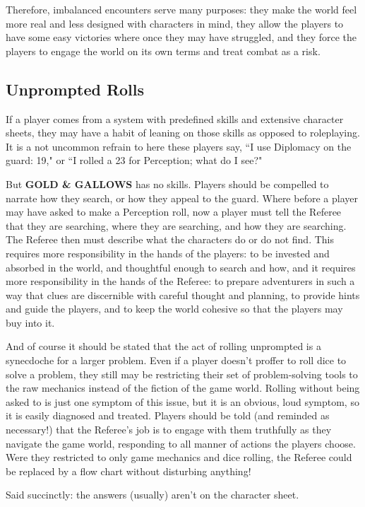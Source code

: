 \documentclass[twoside]{article}
\begin{document}
\bigbreak

Therefore, imbalanced encounters serve many purposes: they make the world feel more real and less designed with characters in mind, they allow the players to have some easy victories where once they may have struggled, and they force the players to engage the world on its own terms and treat combat as a risk.

\subsection*{Unprompted Rolls}

If a player comes from a system with predefined skills and extensive character sheets, they may have a habit of leaning on those skills as opposed to roleplaying. It is a not uncommon refrain to here these players say, ``I use Diplomacy on the guard: 19," or ``I rolled a 23 for Perception; what do I see?"

\bigbreak

But \textbf{GOLD \& GALLOWS} has no skills. Players should be compelled to narrate how they search, or how they appeal to the guard. Where before a player may have asked to make a Perception roll, now a player must tell the Referee that they are searching, where they are searching, and how they are searching. The Referee then must describe what the characters do or do not find. This requires more responsibility in the hands of the players: to be invested and absorbed in the world, and thoughtful enough to search and how, and it requires more responsibility in the hands of the Referee: to prepare adventurers in such a way that clues are discernible with careful thought and planning, to provide hints and guide the players, and to keep the world cohesive so that the players may buy into it.

\bigbreak

And of course it should be stated that the act of rolling unprompted is a synecdoche for a larger problem. Even if a player doesn't proffer to roll dice to solve a problem, they still may be restricting their set of problem-solving tools to the raw mechanics instead of the fiction of the game world. Rolling without being asked to is just one symptom of this issue, but it is an obvious, loud symptom, so it is easily diagnosed and treated. Players should be told (and reminded as necessary!) that the Referee's job is to engage with them truthfully as they navigate the game world, responding to all manner of actions the players choose. Were they restricted to only game mechanics and dice rolling, the Referee could be replaced by a flow chart without disturbing anything!

\bigbreak

Said succinctly: the answers (usually) aren't on the character sheet.
\end{document}
